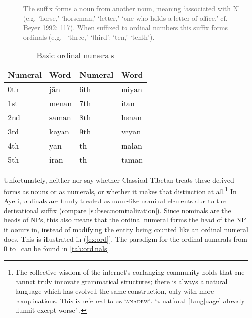 \blockcquote[626]{chungetal2014}{The suffix  forms a noun from another 
noun, meaning `associated with N' (e.g.  `horse,'  
`horseman,'  `letter,'  `one who holds a letter of 
office,' cf.\ \nocite{beyer1992} Beyer 1992: 117). When suffixed to ordinal 
numbers this suffix forms ordinals (e.g.\  `three,'  
`third';  `ten,'  `tenth').}

\begin{table}\centering
\caption{Basic ordinal numerals}
\begin{tabu} to .75\linewidth {X[c] I X[c] I}
\toprule\tableheaderfont
Numeral
	& Word
	& Numeral
	& Word
	\\
\toprule

0th
	& jān %
	& 6th
	& miyan %
	\\

1st
	& menan %
	& 7th
	& itan %
	\\
	
2nd
	& saman %
	& 8th
	& henan %
	\\
	
3rd
	& kayan %
	& 9th
	& veyān %
	\\

4th
	& yan %
	& \ten{}th
	& malan %
	\\

5th
	& iran %
	& \elv{}th
	& taman %
	\\

\bottomrule
\end{tabu}
\label{tab:ordinals}
\end{table}

Unfortunately, neither \citet{chungetal2014} nor \citet{beyer1992} say whether
Classical Tibetan treats these derived forms as nouns or as numerals, or
whether it makes that distinction at all.\footnote{The collective wisdom of the
internet's conlanging community holds that one cannot truly innovate
grammatical structures; there is always a natural language which has evolved
the same construction, only with more complications. This is referred to as 
`\textsc{anadew}': `a nat[ural~]lang[uage] already dunnit except worse'
\citep{teoh2003}.} In Ayeri, ordinals are firmly treated as noun-like nominal
elements due to the derivational suffix  (compare
\autoref{subsec:nominalization}). Since nominals are the heads of NPs, this
also means that the ordinal numeral forms the head of the NP it occurs in,
instead of modifying the entity being counted like an ordinal numeral does.
This is illustrated in (\ref{ex:ord}). The paradigm for the ordinal numerals
from 0 to \elv\ can be found in
\autoref{tab:ordinals}.

